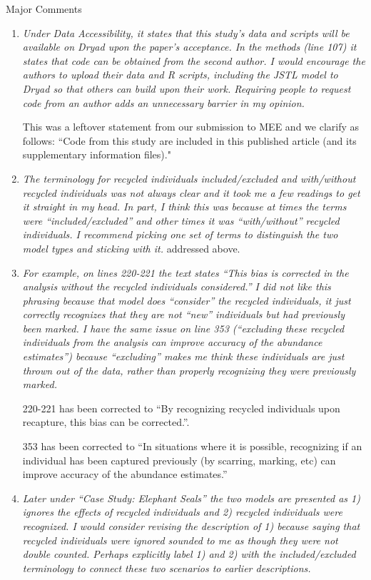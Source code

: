 \documentclass[12pt]{article}
\begin{document}
\noindent Major Comments
\begin{enumerate}
\item  {\it Under Data Accessibility, it states that this study’s data and scripts will be available on Dryad upon the paper’s acceptance. In the methods (line 107) it states that code can be obtained from the second author. I would encourage the authors to upload their data and R scripts, including the JSTL model to Dryad so that others can build upon their work. Requiring people to request code from an author adds an unnecessary barrier in my opinion.}

This was a leftover statement from our submission to MEE and we clarify as follows:
``Code from this study are included in this published article (and its supplementary information files)."

\item  {\it The terminology for recycled individuals included/excluded and with/without recycled individuals was not always clear and it took me a few readings to get it straight in my head. In part, I think this was because at times the terms were “included/excluded” and other times it was “with/without” recycled individuals. I recommend picking one set of terms to distinguish the two model types and sticking with it.}
addressed above.

\item {\it For example, on lines 220-221 the text states “This bias is corrected in the analysis without the recycled individuals considered.” I did not like this phrasing because that model does “consider” the recycled individuals, it just correctly recognizes that they are not “new” individuals but had previously been marked. I have the same issue on line 353 (“excluding these recycled individuals from the analysis can improve accuracy of the abundance estimates”) because “excluding” makes me think these individuals are just thrown out of the data, rather than properly recognizing they were previously marked.}

220-221 has been corrected to ``By recognizing recycled individuals upon recapture, this bias can be corrected.''. 

353 has been corrected to ``In
situations where it is possible, recognizing if an individual has been
captured previously (by scarring, marking, etc) can improve accuracy of the
abundance estimates.''

\item {\it Later under “Case Study: Elephant Seals” the two models are presented as 1) ignores the effects of recycled individuals and 2) recycled individuals were recognized. I would consider revising the description of 1) because saying that recycled individuals were ignored sounded to me as though they were not double counted. Perhaps explicitly label 1) and 2) with the included/excluded terminology to connect these two scenarios to earlier descriptions.}


\end{enumerate}
\end{document}
